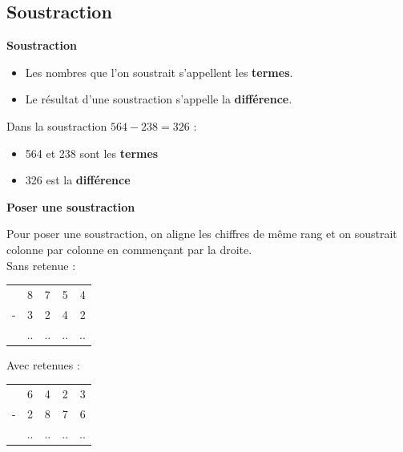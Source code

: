 \subsection{Soustraction}

\begin{definitionbox}
	\textbf{Soustraction}
	\begin{itemize}[label = \textbullet]
		\item Les nombres que l'on soustrait s'appellent les \textbf{termes}.
		\item Le résultat d'une soustraction s'appelle la \textbf{différence}.
	\end{itemize}
\end{definitionbox}

\begin{examplebox}
	Dans la soustraction $564 - 238 = 326$ :
	\begin{itemize}[label = \textbullet]
		\item 564 et 238 sont les \textbf{termes}
		\item 326 est la \textbf{différence}
	\end{itemize}
\end{examplebox}

\begin{methodebox}
	\textbf{Poser une soustraction}
	
	Pour poser une soustraction, on aligne les chiffres de même rang et on soustrait colonne par colonne en commençant par la droite.\\[0.5cm]
	
	Sans retenue :
	\begin{center}
		\begin{tabular}{ccccr}
			& 8 & 7 & 5 & 4 \\
			- & 3 & 2 & 4 & 2 \\
			\hline
			& .. & .. & .. & .. \\
		\end{tabular}
	\end{center}
	
	Avec retenues :
	\begin{center}
		\begin{tabular}{ccccr}
			& 6 & 4 & 2 & 3 \\
			- & 2 & 8 & 7 & 6 \\
			\hline
			& .. & .. & .. & .. \\
		\end{tabular}
	\end{center}
\end{methodebox}

